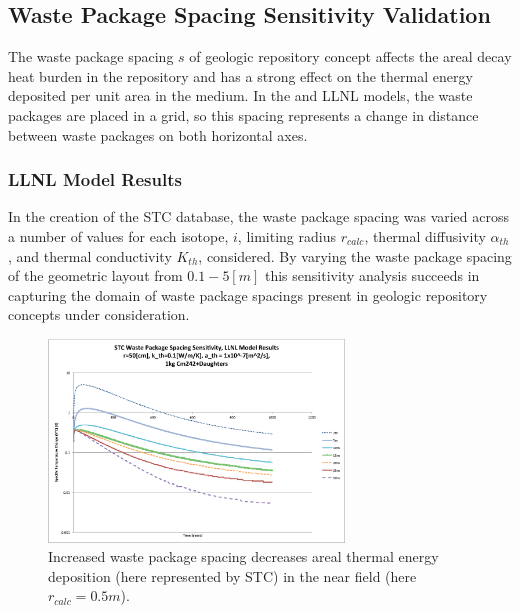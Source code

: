 \subsection{Waste Package Spacing Sensitivity Validation}\label{sec:spacing}
The waste package spacing $s$ of geologic repository concept affects the areal 
decay heat burden in the repository and has a strong effect on the thermal 
energy deposited per unit area in the medium. In the \Cyder and \gls{LLNL} 
models, the waste packages are placed in a grid, so this spacing represents a 
change in distance between waste packages on both horizontal axes.

\FloatBarrier
\subsubsection{LLNL Model Results}

In the creation of the \gls{STC} database, the waste package spacing was varied 
across a number of values for each isotope, $i$, limiting 
radius $r_{calc}$, thermal diffusivity $\alpha_{th}$, and thermal conductivity $K_{th}$, considered.  By 
varying the waste package spacing of the geometric layout from $0.1-5 [m]$
this sensitivity analysis succeeds in capturing the domain of 
waste package spacings present in geologic repository concepts under 
consideration. 

\begin{figure}[htbp!]
\begin{center}
\includegraphics[width=0.7\textwidth]{./chapters/demonstration/spacing/Cm242spacing_sens.eps}
\end{center}
\caption[Thermal Sensitivity to $K_{th}$ and $s$]{Increased waste package 
spacing decreases areal thermal energy deposition 
(here represented by \gls{STC}) in the near field (here $r_{calc} = 0.5m$).}
\label{fig:Cm242spacing_sens}
\end{figure}

